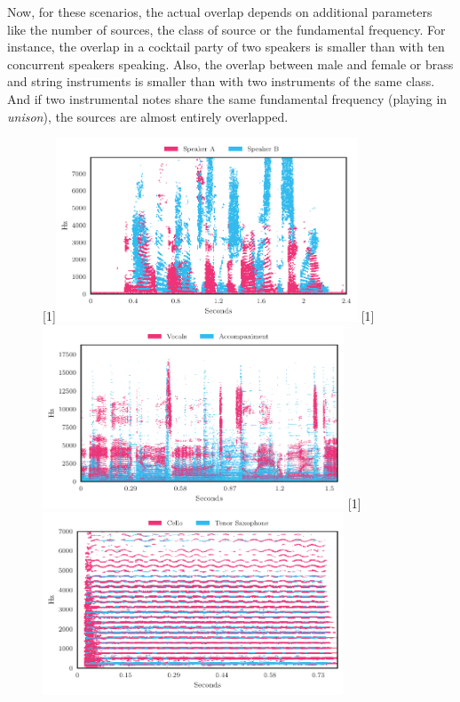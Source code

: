 Now, for these scenarios, the actual overlap depends on additional parameters like the number of sources, the class of source or the fundamental frequency.
For instance, the overlap in a cocktail party of two speakers is smaller than with ten concurrent speakers speaking.
Also, the overlap between male and female or brass and string instruments is smaller than with two instruments of the same class. 
And if two instrumental notes share the same fundamental frequency (playing in \emph{unison}), the sources are almost entirely overlapped.
\par
\begin{figure}[hb]
\centering
{}%
[1\textwidth]{\includegraphics[width=0.8\textwidth]{Chapters/02_Fundamentals/figures/dominance_map_speakers.pdf}}%
\hspace{0.2\textwidth} %
[1\textwidth]{\includegraphics[width=0.8\textwidth]{Chapters/02_Fundamentals/figures/dominance_map_vocacc.pdf}}%
\hspace{0.2\textwidth} %
[1\textwidth]{\includegraphics[width=0.8\textwidth]{Chapters/02_Fundamentals/figures/dominance_map_unison.pdf}}%

\end{figure}
